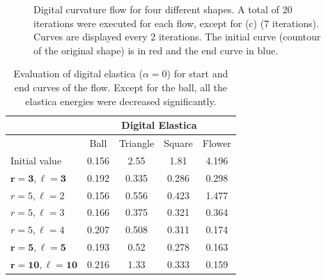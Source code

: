\documentclass[runningheads]{llncs}
\begin{document}
\begin{figure}[!ht]
{		\hspace{15pt}
		\hspace{15pt}
		}

		\caption{Digital curvature flow for four different shapes. A total of 20 iterations were executed for each flow, except for (c) (7 iterations). Curves are displayed every 2 iterations. The initial curve (countour of the original shape) is in red and the end curve in blue.}
		\label{fig:digital_flows}	
	\end{figure}


\begin{table}[!ht]
\center
\begin{tabular}{l|c|c|c|c}
	& \multicolumn{4}{c}{Digital Elastica}\\
	\hline
	& Ball & Triangle  & Square & Flower \\
	\hline
	Initial value & 0.156 & 2.55 & 1.81 & 4.196\\
	\hline	
	$\mathbf{r=3,\ell=3}$ & 0.192 & 0.335 & 0.286 & 0.298\\
	\hline
	$r=5,\ell=2$ & 0.156 & 0.556 & 0.423 & 1.477 \\
	$r=5,\ell=3$ & 0.166 & 0.375 & 0.321 & 0.364 \\	 
	$r=5,\ell=4$ & 0.207 & 0.508 & 0.311 & 0.174\\
	$\mathbf{r=5,\ell=5}$ & 0.193 & 0.52 & 0.278 & 0.163\\	
	\hline
	$\mathbf{r=10,\ell=10}$ & 0.216 & 1.33 & 0.333 & 0.159		
\end{tabular}
\caption{Evaluation of digital elastica ($\alpha=0$) for start and end curves of the flow. Except for the ball, all the elastica energies were decreased significantly.}
\label{tab:digital_glows_elastica_result}
\end{table}
\end{document}
